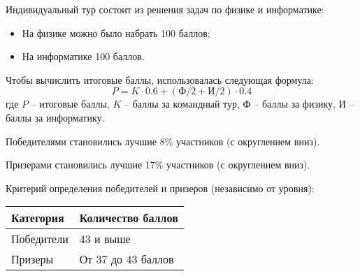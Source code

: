 Индивидуальный тур состоит из решения задач по физике и информатике:
\begin{itemize}
    \item На физике можно было набрать 100 баллов;
    \item На информатике 100 баллов.
\end{itemize}

Чтобы вычислить итоговые баллы, использовалась следующая формула:
$$P = K \cdot 0.6 + (\text{Ф}/2+\text{И}/2) \cdot 0.4$$
где $P$ – итоговые баллы, $K$ – баллы за командный тур, $\text{Ф}$ – баллы за физику, $\text{И}$ –
баллы за информатику.

Победителями становились лучшие 8\% участников (с округлением вниз).

Призерами становились лучшие 17\% участников (с округлением вниз).

Критерий определения победителей и призеров (независимо от уровня):
\begin{center}
    \begin{tabular}{|l|l|}
        \hline
        Категория& Количество баллов\\
        \hline
        Победители&43 и выше\\
        \hline
        Призеры&От 37 до 43 баллов \\
        \hline
    \end{tabular}
\end{center}

